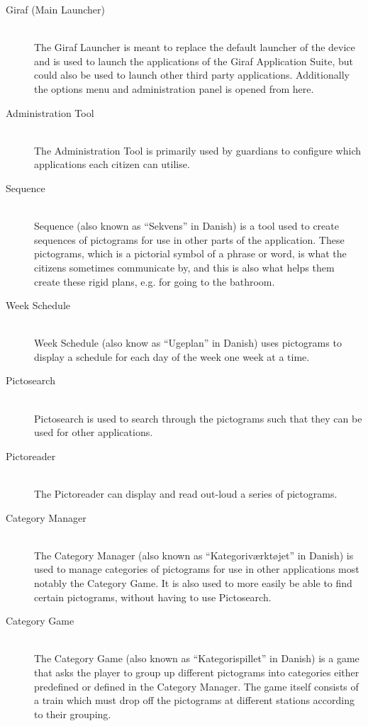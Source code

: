 \begin{description}
	\item[Giraf (Main Launcher)]\hfill \\
	The Giraf Launcher is meant to replace the default launcher of the device and is used to launch the applications of the Giraf Application Suite, but could also be used to launch other third party applications.
	Additionally the options menu and administration panel is opened from here.
	\item[Administration Tool]\hfill \\
	The Administration Tool is primarily used by guardians to configure which applications each citizen can utilise.
	\item[Sequence] \hfill \\
	Sequence (also known as ``Sekvens'' in Danish) is a tool used to create sequences of pictograms for use in other parts of the application.
	These pictograms, which is a pictorial symbol of a phrase or word, is what the citizens sometimes communicate by, and this is also what helps them create these rigid plans, e.g. for going to the bathroom.
	\item[Week Schedule] \hfill \\
	Week Schedule (also know as ``Ugeplan'' in Danish) uses pictograms to display a schedule for each day of the week one week at a time.
	\item[Pictosearch] \hfill \\
	Pictosearch is used to search through the pictograms such that they can be used for other applications.
	\item[Pictoreader] \hfill \\
	The Pictoreader can display and read out-loud a series of pictograms.
	\item[Category Manager] \hfill \\
	The Category Manager (also known as ``Kategoriværktøjet'' in Danish) is used to manage categories of pictograms for use in other applications most notably the Category Game.
	It is also used to more easily be able to find certain pictograms, without having to use Pictosearch.
	\item[Category Game] \hfill \\
	The Category Game (also known as ``Kategorispillet'' in Danish) is a game that asks the player to group up different pictograms into categories either predefined or defined in the Category Manager.
	The game itself consists of a train which must drop off the pictograms at different stations according to their grouping.

\end{description}
